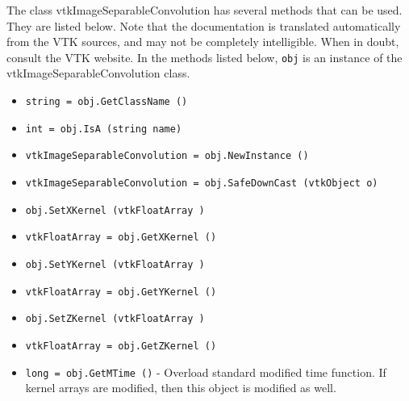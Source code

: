 The class vtkImageSeparableConvolution has several methods that can be used.
  They are listed below.
Note that the documentation is translated automatically from the VTK sources,
and may not be completely intelligible.  When in doubt, consult the VTK website.
In the methods listed below, \verb|obj| is an instance of the vtkImageSeparableConvolution class.
\begin{itemize}
\item  \verb|string = obj.GetClassName ()|

\item  \verb|int = obj.IsA (string name)|

\item  \verb|vtkImageSeparableConvolution = obj.NewInstance ()|

\item  \verb|vtkImageSeparableConvolution = obj.SafeDownCast (vtkObject o)|

\item  \verb|obj.SetXKernel (vtkFloatArray )|

\item  \verb|vtkFloatArray = obj.GetXKernel ()|

\item  \verb|obj.SetYKernel (vtkFloatArray )|

\item  \verb|vtkFloatArray = obj.GetYKernel ()|

\item  \verb|obj.SetZKernel (vtkFloatArray )|

\item  \verb|vtkFloatArray = obj.GetZKernel ()|

\item  \verb|long = obj.GetMTime ()| -  Overload standard modified time function. If kernel arrays are modified,
 then this object is modified as well.

\end{itemize}

